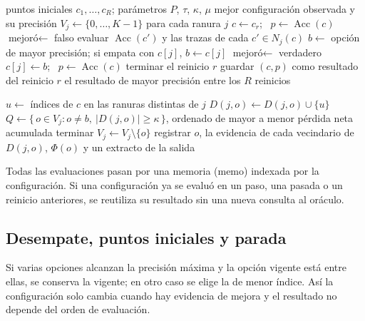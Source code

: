 \documentclass[12pt,letterpaper]{article}
\theoremstyle{definition}
\newcommand{\Acc}{\operatorname{Acc}}
\begin{document}
\begin{algorithm}[H]
\caption{Ascenso por coordenadas con poda guiada por trazas.}
\begin{algorithmic}[1]
\Require puntos iniciales $c_1, \dots, c_R$; parámetros $P$, $\tau$, $\kappa$, $\mu$
\Ensure mejor configuración observada y su precisión
\State $V_j \gets \{0, \dots, K-1\}$ para cada ranura $j$
  \State $c \gets c_r$; \ $p \gets \Acc(c)$
    \State $\text{mejoró} \gets$ falso
      \State evaluar $\Acc(c')$ y las trazas de cada $c' \in N_j(c)$
      \State $b \gets$ opción de mayor precisión; si empata con $c[j]$, $b \gets c[j]$
      \State {}
      \If{$\Acc(c \text{ con } j = b) > p$} $\text{mejoró} \gets$ verdadero \EndIf
      \State $c[j] \gets b$; \ $p \gets \Acc(c)$
    \EndFor
     terminar el reinicio $r$ \EndIf
  \EndFor
  \State guardar $(c, p)$ como resultado del reinicio $r$
\EndFor
\State \Return el resultado de mayor precisión entre los $R$ reinicios
\end{algorithmic}
\end{algorithm}

\begin{algorithm}[H]
\caption{Procedimiento \textsc{Podar}$(j, b, c)$.}
\begin{algorithmic}[1]
\State $u \gets$ índices de $c$ en las ranuras distintas de $j$
   $D(j,o) \gets D(j,o) \cup \{u\}$ \EndIf
\EndFor
\State $Q \gets \{\, o \in V_j : o \neq b,\ |D(j,o)| \geq \kappa \,\}$, ordenado de mayor a menor pérdida neta acumulada
   terminar \EndIf
  \State $V_j \gets V_j \setminus \{o\}$
  \State registrar $o$, la evidencia de cada vecindario de $D(j,o)$, $\Phi(o)$ y un extracto de la salida
\EndFor
\end{algorithmic}
\end{algorithm}

Todas las evaluaciones pasan por una memoria (memo) indexada por la configuración. Si una configuración ya se evaluó en un paso, una pasada o un reinicio anteriores, se reutiliza su resultado sin una nueva consulta al oráculo.

\subsection{Desempate, puntos iniciales y parada}
Si varias opciones alcanzan la precisión máxima y la opción vigente está entre ellas, se conserva la vigente; en otro caso se elige la de menor índice. Así la configuración solo cambia cuando hay evidencia de mejora y el resultado no depende del orden de evaluación.
\end{document}

